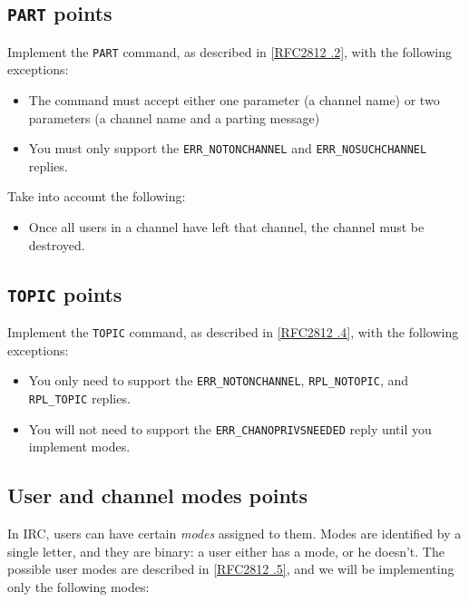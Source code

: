 \documentclass[10pt]{article}
\newcommand{\RFCsection}[2]{\href{http://tools.ietf.org/html/rfc#1\#section-#2}{[RFC#1 \textsection #2]}}
\newcommand{\points}[1]{{\sffamily\mdseries\guillemotleft #1 points\guillemotright{}}}
\begin{document}
\subsection{\texttt{PART} \points{10}}

Implement the \texttt{PART} command, as described in \RFCsection{2812}{3.2.2}, with the following exceptions:

\begin{itemize}
\item The command must accept either one parameter (a channel name) or two parameters (a channel name and a parting message)
\item You must only support the \texttt{ERR\_NOTONCHANNEL} and \texttt{ERR\_NOSUCHCHANNEL} replies.
\end{itemize}

\noindent Take into account the following:

\begin{itemize}
\item Once all users in a channel have left that channel, the channel must be destroyed.
\end{itemize}


\subsection{\texttt{TOPIC} \points{10}}

Implement the \texttt{TOPIC} command, as described in \RFCsection{2812}{3.2.4}, with the following exceptions:

\begin{itemize}
\item You only need to support the \texttt{ERR\_NOTONCHANNEL}, \texttt{RPL\_NOTOPIC}, and \texttt{RPL\_TOPIC} replies.
\item You will not need to support the \texttt{ERR\_CHANOPRIVSNEEDED} reply until you implement modes.
\end{itemize}


\subsection{User and channel modes \points{25}}

In IRC, users can have certain \emph{modes} assigned to them. Modes are identified by a single letter, and they are binary: a user either has a mode, or he doesn't. The possible user modes are described in \RFCsection{2812}{3.1.5}, and we will be implementing only the following modes:
\end{document}
